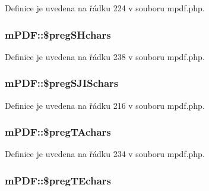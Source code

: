 Definice je uvedena na řádku 224 v souboru mpdf.\-php.

\hypertarget{classm_p_d_f_a254e9184d07dc33a7dc682d0cd4de53a}{
\subsubsection[{\$preg\-S\-Hchars}]{\setlength{\rightskip}{0pt plus 5cm}m\-P\-D\-F\-::\$preg\-S\-Hchars}}\label{classm_p_d_f_a254e9184d07dc33a7dc682d0cd4de53a}


Definice je uvedena na řádku 238 v souboru mpdf.\-php.

\hypertarget{classm_p_d_f_a7024f5d39fcb8c5826431b7fc96177ca}{
\subsubsection[{\$preg\-S\-J\-I\-Schars}]{\setlength{\rightskip}{0pt plus 5cm}m\-P\-D\-F\-::\$preg\-S\-J\-I\-Schars}}\label{classm_p_d_f_a7024f5d39fcb8c5826431b7fc96177ca}


Definice je uvedena na řádku 216 v souboru mpdf.\-php.

\hypertarget{classm_p_d_f_aedb71aee8f2e2e74a16615aa91ac1204}{
\subsubsection[{\$preg\-T\-Achars}]{\setlength{\rightskip}{0pt plus 5cm}m\-P\-D\-F\-::\$preg\-T\-Achars}}\label{classm_p_d_f_aedb71aee8f2e2e74a16615aa91ac1204}


Definice je uvedena na řádku 234 v souboru mpdf.\-php.

\hypertarget{classm_p_d_f_a3d53257c814bfa7a79dfd65e8c55d7c4}{
\subsubsection[{\$preg\-T\-Echars}]{\setlength{\rightskip}{0pt plus 5cm}m\-P\-D\-F\-::\$preg\-T\-Echars}}\label{classm_p_d_f_a3d53257c814bfa7a79dfd65e8c55d7c4}



